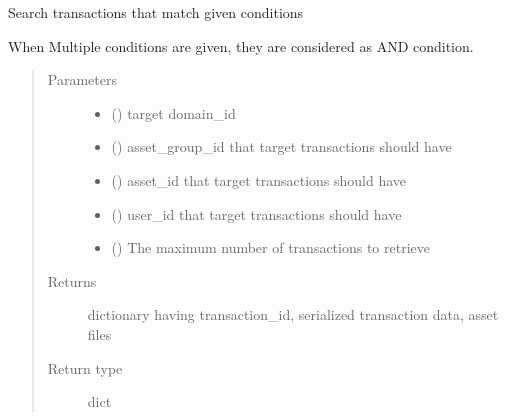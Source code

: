 \documentclass[letterpaper,10pt,english]{sphinxmanual}
\begin{document}
\begin{fulllineitems}
\begin{fulllineitems}
\label{\detokenize{bbc1.core.bbc_core:bbc1.core.bbc_core.BBcCoreService.search_transaction_with_condition}}
Search transactions that match given conditions

When Multiple conditions are given, they are considered as AND condition.
\begin{quote}\begin{description}
\item[{Parameters}] \leavevmode\begin{itemize}
\item {} 
 () \textendash{} target domain\_id

\item {} 
 () \textendash{} asset\_group\_id that target transactions should have

\item {} 
 () \textendash{} asset\_id that target transactions should have

\item {} 
 () \textendash{} user\_id that target transactions should have

\item {} 
 () \textendash{} The maximum number of transactions to retrieve

\end{itemize}

\item[{Returns}] \leavevmode
dictionary having transaction\_id, serialized transaction data, asset files

\item[{Return type}] \leavevmode
dict

\end{description}\end{quote}


\end{fulllineitems}
\end{fulllineitems}
\end{document}
